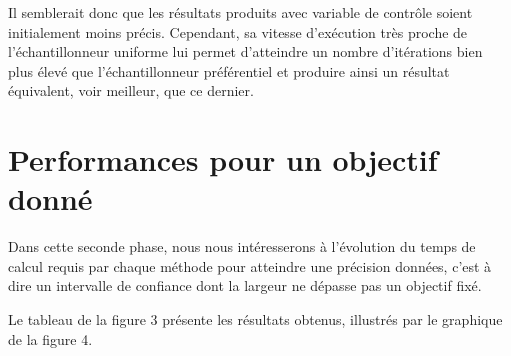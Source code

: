 \documentclass[a4paper,11pt]{article}
\begin{document}
Il semblerait donc que les résultats produits avec variable de contrôle soient initialement moins précis. Cependant, sa vitesse d'exécution très proche de l'échantillonneur uniforme lui permet d'atteindre un nombre d'itérations bien plus élevé que l'échantillonneur préférentiel et produire ainsi un résultat équivalent, voir meilleur, que ce dernier.

\section{Performances pour un objectif donné}

Dans cette seconde phase, nous nous intéresserons à l'évolution du temps de calcul requis par chaque méthode pour atteindre une précision données, c'est à dire un intervalle de confiance dont la largeur ne dépasse pas un objectif fixé.

Le tableau de la figure 3 présente les résultats obtenus, illustrés par le graphique de la figure 4.
\end{document}

